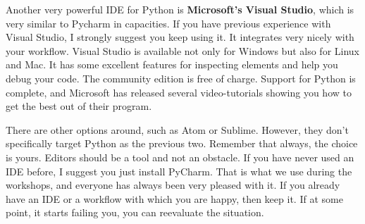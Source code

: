 Another very powerful IDE for Python is \textbf{Microsoft's Visual Studio}, which is very similar to Pycharm in capacities. If you have previous experience with Visual Studio, I strongly suggest you keep using it. It integrates very nicely with your workflow. Visual Studio is available not only for Windows but also for Linux and Mac. It has some excellent features for inspecting elements and help you debug your code. The community edition is free of charge. Support for Python is complete, and Microsoft has released several video-tutorials showing you how to get the best out of their program.

There are other options around, such as Atom or Sublime. However, they don't specifically target Python as the previous two. Remember that always, the choice is yours. Editors should be a tool and not an obstacle. If you have never used an IDE before, I suggest you just install PyCharm. That is what we use during the workshops, and everyone has always been very pleased with it. If you already have an IDE or a workflow with which you are happy, then keep it. If at some point, it starts failing you, you can reevaluate the situation.

